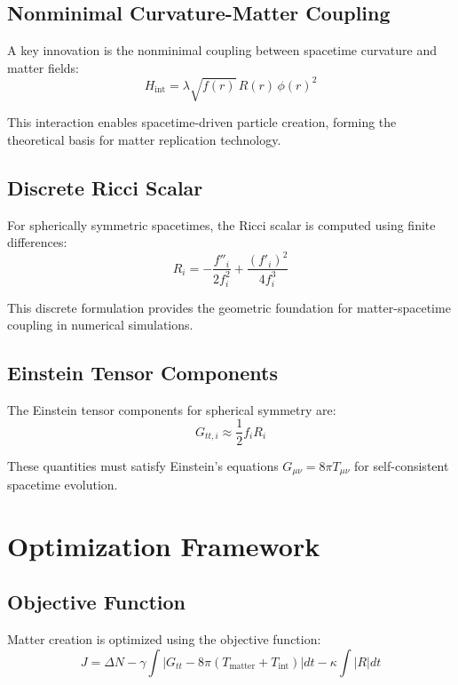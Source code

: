 \documentclass[11pt]{article}
\begin{document}
\subsection{Nonminimal Curvature-Matter Coupling}

A key innovation is the nonminimal coupling between spacetime curvature and matter fields:
\begin{equation}
H_{\text{int}} = \lambda\sqrt{f(r)}\,R(r)\,\phi(r)^2
\end{equation}

This interaction enables spacetime-driven particle creation, forming the theoretical basis for matter replication technology.

\subsection{Discrete Ricci Scalar}

For spherically symmetric spacetimes, the Ricci scalar is computed using finite differences:
\begin{equation}
R_i = -\frac{f''_i}{2f_i^2} + \frac{(f'_i)^2}{4f_i^3}
\end{equation}

This discrete formulation provides the geometric foundation for matter-spacetime coupling in numerical simulations.

\subsection{Einstein Tensor Components}

The Einstein tensor components for spherical symmetry are:
\begin{equation}
G_{tt,i} \approx \frac{1}{2}f_i R_i
\end{equation}

These quantities must satisfy Einstein's equations $G_{\mu\nu} = 8\pi T_{\mu\nu}$ for self-consistent spacetime evolution.

\section{Optimization Framework}

\subsection{Objective Function}

Matter creation is optimized using the objective function:
\begin{equation}
J = \Delta N - \gamma \int |G_{tt} - 8\pi(T_{\text{matter}} + T_{\text{int}})| dt - \kappa \int |R| dt
\end{equation}
\end{document}
